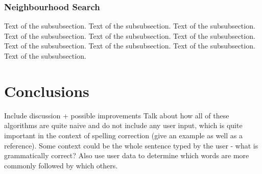\documentclass[11pt]{article}
\begin{document}
\subsubsection{Neighbourhood Search}

Text of the subsubsection.
Text of the subsubsection.
Text of the subsubsection.
Text of the subsubsection.
Text of the subsubsection.
Text of the subsubsection.
Text of the subsubsection.
Text of the subsubsection.
Text of the subsubsection.
Text of the subsubsection.






\section{Conclusions}

Include discussion + possible improvements
Talk about how all of these algorithms are quite naive and do not include any user input, which is quite important in the context of spelling correction (give an example as well as a reference). Some context could be the whole sentence typed by the user - what is grammatically correct? Also use user data to determine which words are more commonly followed by which others.
\end{document}

